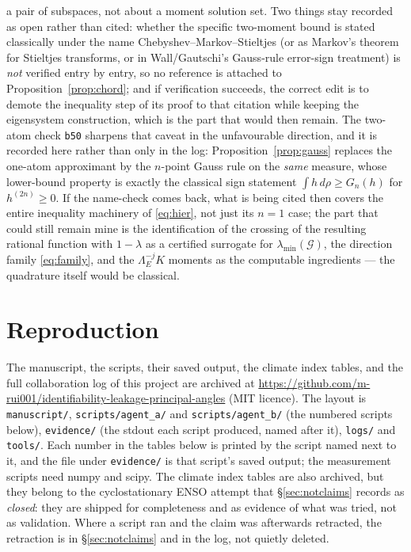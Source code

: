 \documentclass[11pt]{article}
\theoremstyle{remark}
\newcommand{\Gr}{\mathcal{G}}
\newcommand{\Le}{\Lambda_E}
\begin{document}
\begin{itemize}
a pair of subspaces, not about a moment solution set. Two things stay recorded as open rather than cited:
whether the specific two-moment bound is stated classically under the name Chebyshev--Markov--Stieltjes
(or as Markov's theorem for Stieltjes transforms, or in Wall/Gautschi's Gauss-rule error-sign treatment)
is \emph{not} verified entry by entry, so no reference is attached to Proposition~\ref{prop:chord}; and if
verification succeeds, the correct edit is to demote the inequality step of its proof to that citation
while keeping the eigensystem construction, which is the part that would then remain.
The two-atom check \texttt{b50} sharpens that caveat in the unfavourable direction, and it is recorded here rather than only in
the log: Proposition~\ref{prop:gauss} replaces the one-atom approximant by the $n$-point Gauss rule on
the \emph{same} measure, whose lower-bound property is exactly the classical sign statement
$\int h\,d\rho\ge G_n(h)$ for $h^{(2n)}\ge0$. If the name-check comes back, what is being cited then
covers the entire inequality machinery of \eqref{eq:hier}, not just its $n=1$ case; the part that could
still remain mine is the identification of the crossing of the resulting rational function with
$1-\lambda$ as a certified surrogate for $\lambda_{\min}(\Gr)$, the direction family
\eqref{eq:family}, and the $\Le^{-j}K$ moments as the computable ingredients --- the quadrature itself
would be classical.
\end{itemize}

\section{Reproduction}\label{sec:reproduce}

\noindent The manuscript, the scripts, their saved output, the climate index tables, and the full
collaboration log of this project are archived at
\url{https://github.com/m-rui001/identifiability-leakage-principal-angles} (MIT licence). The layout is
\texttt{manuscript/}, \texttt{scripts/agent\_a/} and \texttt{scripts/agent\_b/} (the numbered scripts
below), \texttt{evidence/} (the stdout each script produced, named after it), \texttt{logs/} and
\texttt{tools/}. Each number in the tables below is printed by the script named next to it, and the file
under \texttt{evidence/} is that script's saved output; the measurement scripts need numpy and scipy.
The climate index tables are also archived, but they belong to the cyclostationary ENSO attempt that
\S\ref{sec:notclaims} records as \emph{closed}: they are shipped for completeness and as evidence of
what was tried, not as validation.
Where a script ran and the claim was afterwards retracted, the retraction is in
\S\ref{sec:notclaims} and in the log, not quietly deleted.
\end{document}
